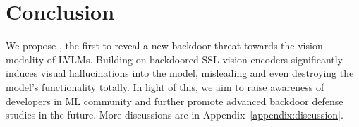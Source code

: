\section{Conclusion}
\label{sec:conclusion}
We propose \project, the first to reveal a new backdoor threat towards the vision modality of LVLMs. Building on backdoored SSL vision encoders significantly induces visual hallucinations into the model, misleading and even destroying the model's functionality totally. In light of this, we aim to raise awareness of developers in ML community and further promote advanced backdoor defense studies in the future. More discussions are in Appendix~\ref{appendix:discussion}.